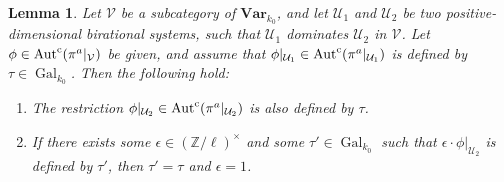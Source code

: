 \documentclass[11pt]{amsart}
\newtheorem{lemma}[proposition]{Lemma}
\theoremstyle{definition}
\theoremstyle{remark}
\numberwithin{equation}{section}
\DeclareMathOperator{\Aut}{Aut}
\DeclareMathOperator{\Gal}{Gal}
\newcommand{\Z}{\mathbb{Z}}
\newcommand{\Vc}{\mathcal{V}}
\newcommand{\Ucal}{\mathcal{U}}
\newcommand{\Autc}{\Aut^{\rm c}}
\newcommand{\Var}{\mathbf{Var}}
\newcommand{\Galk}{{\Gal_{k_0}}}
\begin{document}
\begin{lemma}
\label{lemma: finalproof / iom-main-connected / dominant-lemma}
  Let $\Vc$ be a subcategory of $\Var_{k_0}$, and let $\Ucal_1$ and $\Ucal_2$ be two positive-dimensional birational systems, such that $\Ucal_1$ dominates $\Ucal_2$ in $\Vc$.
  Let $\phi \in \Autc(\pi^a|_\Vc)$ be given, and assume that $\phi|_{\Ucal_1} \in \Autc(\pi^a|_{\Ucal_1})$ is defined by $\tau \in \Galk$.
  Then the following hold:
  \begin{enumerate}
    \item The restriction $\phi|_{\Ucal_2} \in \Autc(\pi^a|_{\Ucal_2})$ is also defined by $\tau$. 
    \item If there exists some $\epsilon \in (\Z/\ell)^\times$ and some $\tau' \in \Galk$ such that $\epsilon \cdot \phi|_{\Ucal_2}$ is defined by $\tau'$, then $\tau' = \tau$ and $\epsilon = 1$.
  \end{enumerate}
\end{lemma}
\end{document}
